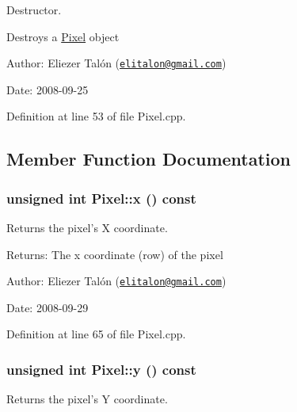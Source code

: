 Destructor. 

Destroys a \hyperlink{class_pixel}{Pixel} object

\begin{Desc}
\item[Author:]Eliezer Talón (\href{mailto:elitalon@gmail.com}{\tt elitalon@gmail.com}) \end{Desc}
\begin{Desc}
\item[Date:]2008-09-25 \end{Desc}


Definition at line 53 of file Pixel.cpp.

\subsection{Member Function Documentation}
\hypertarget{class_pixel_68dafccc4588fb33d445641c2766316b}{
\subsubsection[x]{\setlength{\rightskip}{0pt plus 5cm}unsigned int Pixel::x () const}}
\label{class_pixel_68dafccc4588fb33d445641c2766316b}


Returns the pixel's X coordinate. 

\begin{Desc}
\item[Returns:]The x coordinate (row) of the pixel\end{Desc}
\begin{Desc}
\item[Author:]Eliezer Talón (\href{mailto:elitalon@gmail.com}{\tt elitalon@gmail.com}) \end{Desc}
\begin{Desc}
\item[Date:]2008-09-29 \end{Desc}


Definition at line 65 of file Pixel.cpp.\hypertarget{class_pixel_204cc91a99e1e4f1d96c9cf6caf5747a}{
\subsubsection[y]{\setlength{\rightskip}{0pt plus 5cm}unsigned int Pixel::y () const}}
\label{class_pixel_204cc91a99e1e4f1d96c9cf6caf5747a}


Returns the pixel's Y coordinate. 

